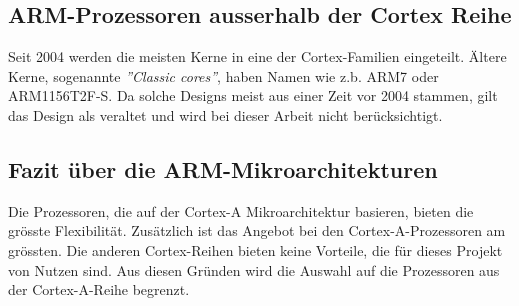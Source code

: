 \subsection{ARM-Prozessoren ausserhalb der Cortex Reihe}
Seit 2004 werden die meisten Kerne in eine der Cortex-Familien eingeteilt.
Ältere Kerne, sogenannte \textit{''Classic cores''}, haben Namen wie z.b. ARM7 oder ARM1156T2F-S.
Da solche Designs meist aus einer Zeit vor 2004 stammen, gilt das Design als veraltet und wird bei dieser Arbeit nicht berücksichtigt.

\subsection{Fazit über die ARM-Mikroarchitekturen}
Die Prozessoren, die auf der Cortex-A Mikroarchitektur basieren, bieten die grösste Flexibilität.
Zusätzlich ist das Angebot bei den Cortex-A-Prozessoren am grössten.
Die anderen Cortex-Reihen bieten keine Vorteile, die für dieses Projekt von Nutzen sind.
Aus diesen Gründen wird die Auswahl auf die Prozessoren aus der Cortex-A-Reihe begrenzt.

